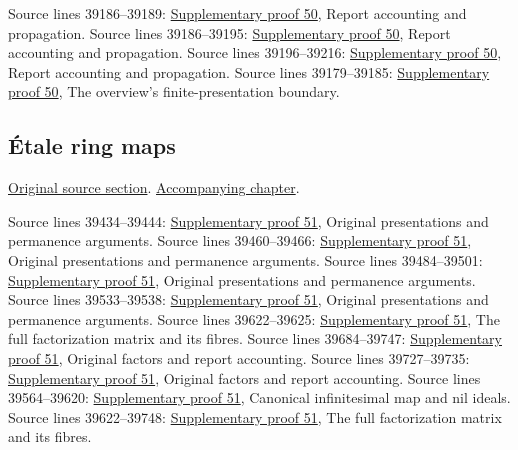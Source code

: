 \begin{AlgebraSourceRoutes}
 Source lines 39186--39189: \hyperlink{algebra_smooth_artin_notes_20260928}{Supplementary proof 50}, Report accounting and propagation.
 Source lines 39186--39195: \hyperlink{algebra_smooth_artin_notes_20260928}{Supplementary proof 50}, Report accounting and propagation.
 Source lines 39196--39216: \hyperlink{algebra_smooth_artin_notes_20260928}{Supplementary proof 50}, Report accounting and propagation.
 Source lines 39179--39185: \hyperlink{algebra_smooth_artin_notes_20260928}{Supplementary proof 50}, The overview's finite-presentation boundary.
\end{AlgebraSourceRoutes}

\subsection{\'Etale ring maps}
\hypertarget{algebra-source-section-etale}{}
\noindent\href{https://github.com/stacks/stacks-project/blob/a04446e57ec1fbc252a871afcec7752fb2807b14/algebra.tex\#L39236}{Original source section}. \href{algebra.pdf\#nameddest=section-etale}{Accompanying chapter}.

\begin{AlgebraSourceRoutes}
 Source lines 39434--39444: \hyperlink{algebra_etale_notes_20260928}{Supplementary proof 51}, Original presentations and permanence arguments.
 Source lines 39460--39466: \hyperlink{algebra_etale_notes_20260928}{Supplementary proof 51}, Original presentations and permanence arguments.
 Source lines 39484--39501: \hyperlink{algebra_etale_notes_20260928}{Supplementary proof 51}, Original presentations and permanence arguments.
 Source lines 39533--39538: \hyperlink{algebra_etale_notes_20260928}{Supplementary proof 51}, Original presentations and permanence arguments.
 Source lines 39622--39625: \hyperlink{algebra_etale_notes_20260928}{Supplementary proof 51}, The full factorization matrix and its fibres.
 Source lines 39684--39747: \hyperlink{algebra_etale_notes_20260928}{Supplementary proof 51}, Original factors and report accounting.
 Source lines 39727--39735: \hyperlink{algebra_etale_notes_20260928}{Supplementary proof 51}, Original factors and report accounting.
 Source lines 39564--39620: \hyperlink{algebra_etale_notes_20260928}{Supplementary proof 51}, Canonical infinitesimal map and nil ideals.
 Source lines 39622--39748: \hyperlink{algebra_etale_notes_20260928}{Supplementary proof 51}, The full factorization matrix and its fibres.
\end{AlgebraSourceRoutes}


